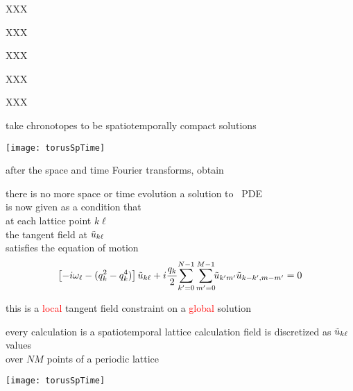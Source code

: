 \begin{frame}{XXX}
\end{frame}

\begin{frame}{XXX}
\end{frame}

\begin{frame}{XXX}
\end{frame}

\begin{frame}{XXX}
\end{frame}

\begin{frame}{XXX}
\end{frame}

\begin{frame}{take chronotopes to be spatiotemporally compact solutions}
\begin{center}
\texttt{[image: torusSpTime]}
\end{center}

\bigskip

after the space and time Fourier transforms, obtain
\end{frame}

\begin{frame}{there is no more space or time evolution}
a solution to \KS\ PDE \\
is now given as a condition that \\
at each lattice point $k\ell$ \\
the tangent field at $\tilde{u}_{k\ell}$ \\
satisfies the equation of motion
\[
\left[- i \omega_\ell - ( q_k^2 - q_k^4 ) \right]\tilde{u}_{k\ell}
+ i \frac{q_k}{2} \!\sum_{k'=0}^{N-1} \sum^{M-1}_{m'=0}\!\!
\tilde{u}_{k'm'} \tilde{u}_{k-k',m-m'}
    =
0
\]

\bigskip

this is a \textcolor{red}{local} tangent field constraint on a
\textcolor{red}{global} solution
\end{frame}

\begin{frame}{every calculation is a spatiotemporal lattice calculation}
field is discretized as
$\tilde{u}_{k\ell}$ values  \\ over
$N M$ points of a periodic lattice


\begin{center}
\texttt{[image: torusSpTime]}
\end{center}
\end{frame}


